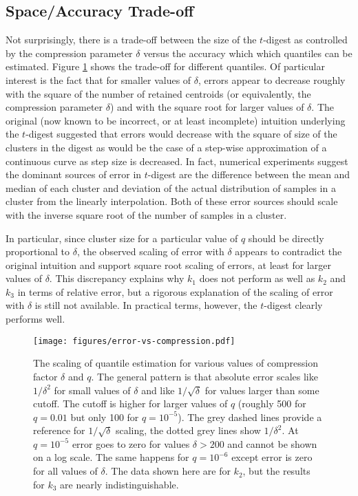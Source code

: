\documentclass[]{statsoc}
\begin{document}
\subsection{Space/Accuracy Trade-off}
Not surprisingly, there is a trade-off between the size of the $t$-digest as controlled by the compression parameter $\delta$ versus the accuracy which which quantiles can be estimated.  Figure \ref{fig:accuracy-scaling} shows the trade-off for different quantiles. Of particular interest is the fact that for smaller values of $\delta$, errors appear to decrease roughly with the  square of the number of retained centroids (or equivalently, the compression parameter $\delta$) and with the square root for larger values of $\delta$. The original (now known to be incorrect, or at least incomplete) intuition underlying the $t$-digest suggested that errors would decrease with the square of size of the clusters in the digest as would be the case of a step-wise approximation of a continuous curve as step size is decreased. In fact, numerical experiments suggest the dominant sources of error in $t$-digest are the difference between the mean and median of each cluster and deviation of the actual distribution of samples in a cluster from the linearly interpolation. Both of these error sources should scale with the inverse square root of the number of samples in a cluster.

In particular, since cluster size for a particular value of $q$ should be directly proportional to $\delta$,  the observed scaling of error with $\delta$ appears to contradict the original intuition and support square root scaling of errors, at least for larger values of $\delta$. This discrepancy explains why $k_1$ does not perform as well as $k_2$ and $k_3$ in terms of relative error, but a rigorous explanation of the scaling of error with $\delta$ is still not available. In practical terms, however, the $t$-digest clearly performs well.


\begin{figure}[p] %
   \centering
   \texttt{[image: figures/error-vs-compression.pdf]} 
   \caption{The scaling of quantile estimation for various values of compression factor $\delta$ and $q$. 
   The general pattern is that absolute error scales like $1/\delta^2$ for small values of $\delta$ and like $1/\sqrt{\delta}$ for values larger than some cutoff. The cutoff is higher for larger values of $q$ (roughly 500 for $q=0.01$ but only 100 for $q=10^{-5}$). The grey dashed lines provide a reference for $1/\sqrt{\delta}$ scaling, the dotted grey lines show $1/\delta^2$.   At $q=10^{-5}$ error goes to zero for values $\delta > 200$ and cannot be shown on a log scale. The same happens for $q=10^{-6}$ except error is zero for all values of $\delta$. The data shown here are for $k_2$, but the results for $k_3$ are nearly indistinguishable.}
   \label{fig:accuracy-scaling}
\end{figure}
\end{document}
